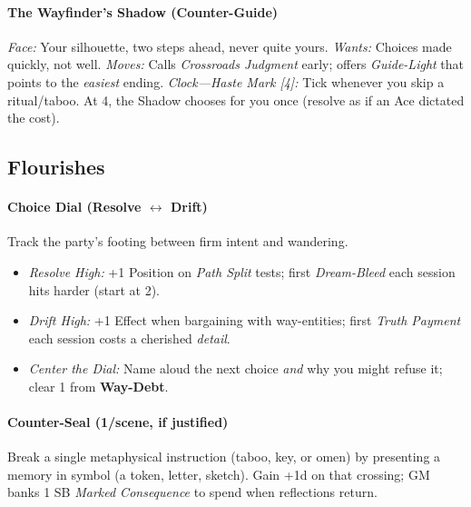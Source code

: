\paragraph*{The Wayfinder’s Shadow (Counter-Guide)}
\emph{Face:} Your silhouette, two steps ahead, never quite yours.  
\emph{Wants:} Choices made quickly, not well.  
\emph{Moves:} Calls \emph{Crossroads Judgment} early; offers \emph{Guide-Light} that points to the \emph{easiest} ending.  
\emph{Clock—Haste Mark [4]:} Tick whenever you skip a ritual/taboo. At 4, the Shadow chooses for you once (resolve as if an Ace dictated the cost).

\subsection*{Flourishes}
\paragraph*{Choice Dial (Resolve \(\leftrightarrow\) Drift)}
Track the party’s footing between firm intent and wandering.
\begin{itemize}
  \item \emph{Resolve High:} +1 Position on \emph{Path Split} tests; first \emph{Dream-Bleed} each session hits harder (start at 2).
  \item \emph{Drift High:} +1 Effect when bargaining with way-entities; first \emph{Truth Payment} each session costs a cherished \emph{detail}.
  \item \emph{Center the Dial:} Name aloud the next choice \emph{and} why you might refuse it; clear 1 from \textbf{Way-Debt}.
\end{itemize}

\paragraph*{Counter-Seal (1/scene, if justified)}
Break a single metaphysical instruction (taboo, key, or omen) by presenting a memory in symbol (a token, letter, sketch). Gain +1d on that crossing; GM banks 1 SB \emph{Marked Consequence} to spend when reflections return.

